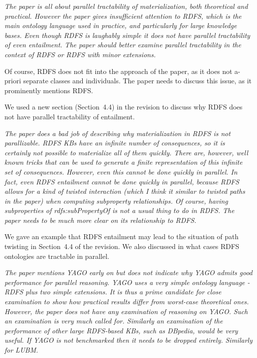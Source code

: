 \documentclass{article}
\let\quoteOld\quote
\let\endquoteOld\endquote
\renewenvironment{quote}{\quoteOld\itshape}{\endquoteOld}
\begin{document}
\begin{quote}
The paper is all about parallel tractability of materialization, both
theoretical and practical.  However the paper gives insufficient attention
to RDFS, which is the main ontology language used in practice, and
particularly for large knowledge bases.  Even though RDFS is laughably
simple it does not have parallel tractability of even entailment.  The paper
should better examine parallel tractability in the context of RDFS or RDFS
with minor extensions.

Of course, RDFS does not fit into the approach of the paper, as it does not
a-priori separate classes and individuals.  The paper needs to discuss this
issue, as it prominently mentions RDFS.
\end{quote}

We used a new section (Section~4.4) in the revision to discuss why RDFS
does not have parallel tractability of entailment.

\begin{quote}
The paper does a bad job of describing why materialization in RDFS is not
parallizable.  RDFS KBs have an infinite number of consequences, so it is
certainly not possible to materialize all of them quickly.  There are,
however, well known tricks that can be used to generate a finite
representation of this infinite set of consequences.  However, even this
cannot be done quickly in parallel.  In fact, even RDFS entailment cannot be
done quickly in parallel, because RDFS allows for a kind of twisted
interaction (which I think it similar to twisted paths in the paper) when
computing subproperty relationships.  Of course, having subproperties of
rdfs:subPropertyOf is not a usual thing to do in RDFS.  The paper needs to
be much more clear on its relationship to RDFS.
\end{quote}

We gave an example that RDFS entailment may lead to the situation of path twisting in Section~4.4 of the revision.
We also discussed in what cases RDFS ontologies are tractable in parallel.

\begin{quote}
The paper mentions YAGO early on but does not indicate why YAGO admits good
performance for parallel reasoning.  YAGO uses a very simple ontology
language - RDFS plus two simple extensions.  It is thus a prime candidate
for close examination to show how practical results differ from worst-case
theoretical ones.  However, the paper does not have any examination of
reasoning on YAGO.  Such an examination is very much called for.  Similarly
an examination of the performance of other large RDFS-based KBs, such as
DBpedia, would be very useful.   If YAGO is not benchmarked then it needs to
be dropped entirely.   Similarly for LUBM.
\end{quote}
\end{document}
